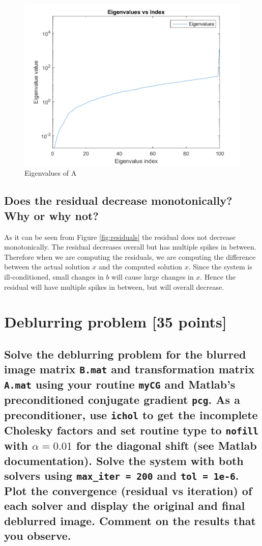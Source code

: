 \documentclass[unicode,11pt,a4paper,oneside,numbers=endperiod,openany]{scrartcl}
\begin{document}
\begin{figure}[H]
    \centering
    \includegraphics[width=0.8\linewidth]{graphs/eigenvalues.png}
    \caption{Eigenvalues of A}
    \label{fig:eigenvalues}
\end{figure}

\subsection{Does the residual decrease monotonically? Why or why not?}
As it can be seen from Figure \ref{fig:residuals} the residual does not decrease monotonically. The residual decreases overall but has multiple spikes in between. Therefore when we are computing the residuals, we are computing the difference between the actual solution $x$ and the computed solution $x$. Since the system is ill-conditioned, small changes in $b$ will cause large changes in $x$. Hence the residual will have multiple spikes in between, but will overall decrease.


\section{Deblurring problem [35 points]}
\subsection{Solve the deblurring problem for the blurred image matrix \texttt{B.mat} and transformation matrix \texttt{A.mat} using your routine \texttt{myCG} and Matlab’s preconditioned conjugate gradient \texttt{pcg}. As a preconditioner, use \texttt{ichol} to get the incomplete Cholesky factors and set routine type to \texttt{nofill} with $\alpha = 0.01$ for the diagonal shift (see Matlab documentation). Solve the system with both solvers using \texttt{max\_iter = 200} and \texttt{tol = 1e-6}. Plot the convergence (residual vs iteration) of each solver and display the original and final deblurred image. Comment on the results that you observe.}
\end{document}
